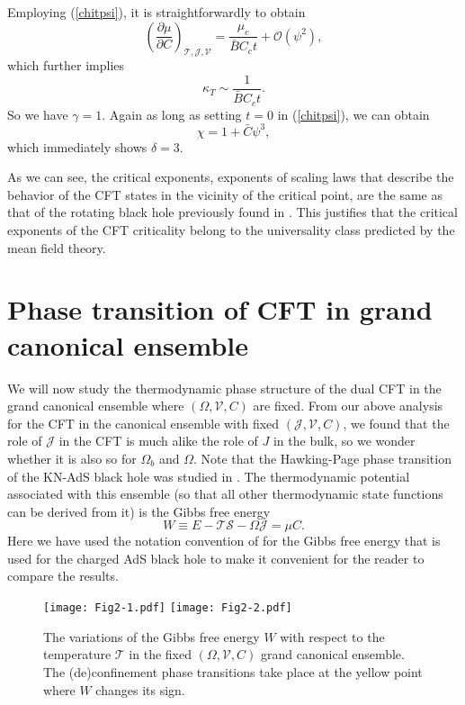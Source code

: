 \documentclass[a4paper,11pt]{article}
\newcommand{\eq}[1]{(\ref{#1})}
\def\T{\mathcal{T}} \def\O{\mathcal{O}} \def\S{\mathcal{S}}\def\J{\mathcal{J}}\def\V{\mathcal{V}}\def\Q{\mathcal{Q}}\def\F{\mathcal{F}}
\begin{document}
Employing \eq{chitpsi}, it is straightforwardly to obtain
\begin{equation}
\left(\frac{\partial \mu}{\partial C}\right)_{\T, \J, \mathcal{V}}=\frac{\mu_c}{\bar{B}C_c t}+\O(\psi^2),
\end{equation}
which further implies
\begin{equation}
\kappa_T \sim \frac{1}{\bar{B}C_c t}.
\end{equation}
So we have $\gamma=1 $. Again as long as setting $t=0$ in \eq{chitpsi}, we can obtain
\begin{equation}
\chi=1+\bar{C} \psi^3,
\end{equation}
which immediately shows $\delta=3$. 

As we can see, the critical exponents, exponents of scaling laws that describe the behavior of the CFT states in the vicinity of the critical point, are the same as that of the rotating black hole previously found in  \cite{Gunasekaran:2012dq}. This justifies that the critical exponents of the CFT criticality  belong to the universality class predicted by the mean field theory.



\section{Phase transition of CFT in grand canonical ensemble}\label{oten}




We will now study the thermodynamic phase structure of the dual CFT in the grand canonical ensemble where $(\Omega, \mathcal{V}, C)$ are fixed.  From our above analysis for the CFT in the canonical ensemble with fixed $(\J, \mathcal{V}, C)$, we found that the role of $\J$ in the CFT is much alike the role of $J$ in the bulk, so we wonder whether it is also so for $\Omega_b$ and $\Omega$. Note that the Hawking-Page phase transition of the KN-AdS black hole was studied in \cite{Caldarelli:1999xj}.  The thermodynamic potential associated with this ensemble (so that all other thermodynamic state functions can be derived from it) is the Gibbs free energy
\begin{equation}
W \equiv E-\T \S-\Omega \J=\mu C.
\end{equation}
Here we have used the notation convention of \cite{Cong:2021fnf} for the Gibbs free energy that is  used for the charged AdS black hole to make it convenient for the reader to compare the results.


\begin{figure}[tbp!]
\begin{center}
\texttt{[image: Fig2-1.pdf]}
\texttt{[image: Fig2-2.pdf]}
\end{center}
\vspace{-5mm}
 \caption {The variations of the Gibbs free energy $W$ with respect to the temperature $\T$ in the fixed $(\Omega, \mathcal{V}, C)$ grand canonical ensemble. The (de)confinement phase transitions take place at the yellow point where $W$ changes its sign.}
 \label{fig4}
\end{figure}
\end{document}
